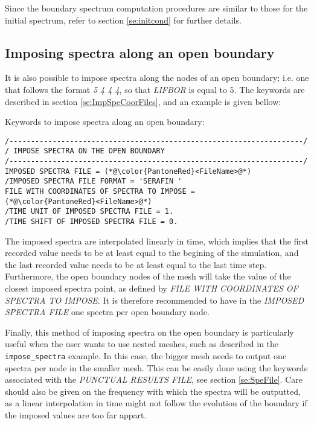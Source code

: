  Since the boundary spectrum computation procedures are similar to those for the initial spectrum, refer to section \ref{se:initcond} for further details.

\subsection{ Imposing spectra along an open boundary}

It is also possible to impose spectra along the nodes of an open boundary; i.e. one that follows the format \textit{5 4 4 4}, so that \textit{LIFBOR} is equal to $5$. The keywords are described in section \ref{se:ImpSpeCoorFiles}, and an example is given bellow:

\begin{CommentBlock}{Keywords to impose spectra along an open boundary:}
\lstset{language=TelemacCas,
        basicstyle=\scriptsize\ttfamily}
\begin{lstlisting}[frame=trBL]
/--------------------------------------------------------------------/
/ IMPOSE SPECTRA ON THE OPEN BOUNDARY
/--------------------------------------------------------------------/
IMPOSED SPECTRA FILE = (*@\color{PantoneRed}<FileName>@*)
/IMPOSED SPECTRA FILE FORMAT = 'SERAFIN '
FILE WITH COORDINATES OF SPECTRA TO IMPOSE =
(*@\color{PantoneRed}<FileName>@*)
/TIME UNIT OF IMPOSED SPECTRA FILE = 1.
/TIME SHIFT OF IMPOSED SPECTRA FILE = 0.
\end{lstlisting}
\end{CommentBlock}

The imposed spectra are interpolated linearly in time, which implies that the first recorded value needs to be at
least equal to the begining of the simulation, and the last recorded value needs to be at least equal to the last
time step. Furthermore, the open boundary nodes of the mesh will take the value of the closest imposed spectra
point, as defined by \textit{FILE WITH COORDINATES OF SPECTRA TO IMPOSE}. It is therefore recommended to have
in the \textit{IMPOSED SPECTRA FILE} one spectra per open boundary node.

Finally, this method of imposing spectra on the open boundary is particularly useful when the user wants to use
nested meshes, such as described in the \texttt{impose\_spectra} example. In this case, the bigger mesh
needs to output one spectra per node in the smaller mesh. This can be easily done using the keywords associated
with the \textit{PUNCTUAL RESULTS FILE}, see section \ref{se:SpeFile}. Care should also be given on the
frequency with which the spectra will be outputted, as a linear interpolation in time might not follow the
evolution of the boundary if the imposed values are too far appart.

